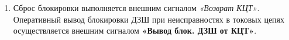 \begin{enumerate}
\begin{enumerate}
\item
Сброс блокировки выполняется внешним сигналом \textit{«Возврат КЦТ»}.
Оперативный вывод блокировки ДЗШ при неисправностях в токовых цепях осуществляется внешним сигналом \textbf{«Вывод блок. ДЗШ от КЦТ»}.

\end{enumerate}


\end{enumerate}
